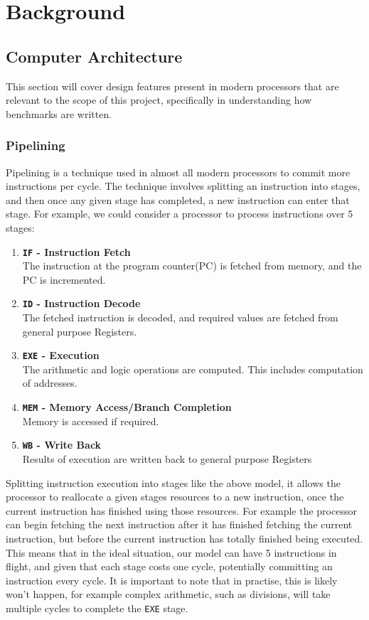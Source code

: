 \documentclass[bsc,frontabs,twoside,singlespacing,parskip,deptreport]{infthesis}     %
\begin{document}
\chapter{Background}\label{chap:bground}
\section{Computer Architecture}
This section will cover design features present in modern processors that are relevant to the scope of this project, specifically in understanding how benchmarks are written.

\subsection{Pipelining}
Pipelining is a technique used in almost all modern processors to commit more instructions per cycle. The technique involves splitting an instruction into stages, and then once any given stage has completed, a new instruction can enter that stage. For example, we could consider a processor to process instructions over 5 stages:
\begin{enumerate}
    \item{{\bf \texttt{IF} - Instruction Fetch} \\ The instruction at the program counter(PC) is fetched from memory, and the PC is incremented.}
    \item{{\bf \texttt{ID} - Instruction Decode} \\ The fetched instruction is decoded, and required values are fetched from general purpose Registers.}
    \item{{\bf \texttt{EXE} - Execution} \\ The arithmetic and logic operations are computed. This includes computation of addresses. }
    \item{{\bf \texttt{MEM} - Memory Access/Branch Completion} \\ Memory is accessed if required.}
    \item{{\bf \texttt{WB} - Write Back} \\ Results of execution are written back to general purpose Registers}
\end{enumerate}
Splitting instruction execution into stages like the above model, it allows the processor to reallocate a given stages resources to a new instruction, once the current instruction has finished using those resources. For example the processor can begin fetching the next instruction after it has finished fetching the current instruction, but before the current instruction has totally finished being executed. This means that in the ideal situation, our model can have 5 instructions in flight, and given that each stage costs one cycle, potentially committing an instruction every cycle. It is important to note that in practise, this is likely won't happen, for example complex arithmetic, such as divisions, will take multiple cycles to complete the \texttt{EXE} stage.
\end{document}
